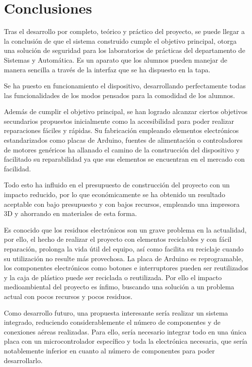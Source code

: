 \chapter{Conclusiones}\label{chp-08}

Tras el desarrollo por completo, teórico y práctico del proyecto, 
se puede llegar a la conclusión de que el sistema construido cumple 
el objetivo principal, otorga una solución de seguridad para los 
laboratorios de prácticas del departamento de Sistemas y Automática. 
Es un aparato que los alumnos pueden manejar de manera sencilla a 
través de la interfaz que se ha dispuesto en la tapa. 

Se ha puesto en funcionamiento el dispositivo, desarrollando perfectamente 
todas las funcionalidades de los modos pensados para la comodidad de los alumnos. 

Además de cumplir el objetivo principal, se han logrado alcanzar ciertos 
objetivos secundarios propuestos inicialmente como la accesibilidad para 
poder realizar reparaciones fáciles y rápidas. Su fabricación empleando 
elementos electrónicos estandarizados como placas de Arduino, fuentes de 
alimentación o controladores de motores genéricos ha allanado el camino de la
construcción del dispositivo y facilitado su reparabilidad ya que sus
elementos se encuentran en el mercado con facilidad.

Todo esto ha influido en el presupuesto de construcción del proyecto con un 
impacto reducido, por lo que económicamente se ha obtenido un resultado 
aceptable con bajo presupuesto y con bajos recursos, empleando una impresora
3D y ahorrando en materiales de esta forma.

Es conocido que los residuos electrónicos son un grave problema en la
actualidad, por ello, el hecho de realizar el proyecto con elementos
reciclables y con fácil reparación, prolonga la vida útil del equipo, 
así como facilita su reciclaje cuando su utilización no resulte más provechosa. 
La placa de Arduino es reprogramable, los componentes electrónicos como 
botones e interruptores pueden ser reutilizados y la caja de plástico 
puede ser reciclada o reutilizada. Por ello el impacto medioambiental 
del proyecto es ínfimo, buscando una solución a un problema actual con 
pocos recursos y pocos residuos.

Como desarrollo futuro, una propuesta interesante sería realizar un sistema 
integrado, reduciendo considerablemente el número de componentes y de conexiones
aéreas realizadas. Para ello, sería necesario integrar todo en una única placa 
con un microcontrolador específico y toda la electrónica necesaria, que sería 
notablemente inferior en cuanto al número de componentes para poder desarrollarlo.